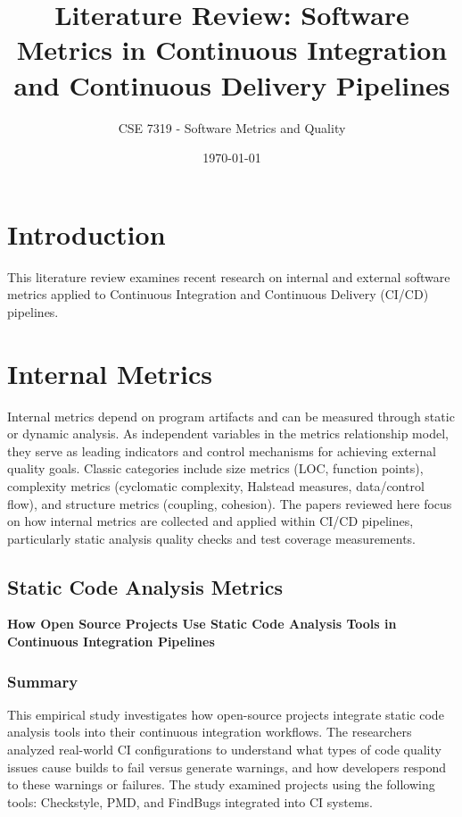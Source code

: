 \documentclass[12pt]{article}
\title{Literature Review: Software Metrics in Continuous Integration
and Continuous Delivery Pipelines}
\author{CSE 7319 - Software Metrics and Quality}
\date{\today}
\begin{document}
\maketitle

\section{Introduction}

This literature review examines recent research on internal and
external software metrics applied to Continuous Integration and Continuous Delivery (CI/CD)
pipelines.

\section{Internal Metrics}

Internal metrics depend on program artifacts and can be
measured through static or dynamic analysis. As independent variables
in the metrics relationship model, they serve as leading indicators
and control mechanisms for achieving external quality goals. Classic
categories include size metrics (LOC, function points), complexity
metrics (cyclomatic complexity, Halstead measures, data/control flow),
and structure metrics (coupling, cohesion). The papers reviewed here
focus on how internal metrics are collected and applied within CI/CD
pipelines, particularly static analysis quality checks and test
coverage measurements.

\subsection{Static Code Analysis Metrics}

\textbf{How Open Source Projects Use Static Code Analysis
	Tools in Continuous Integration Pipelines} \cite{zampetti2017static}

\subsubsection{Summary}
This empirical study investigates how open-source
projects integrate static code analysis tools into their continuous
integration workflows. The researchers analyzed real-world CI
configurations to understand what types of code quality issues cause
builds to fail versus generate warnings, and how developers respond
to these warnings or failures. The study examined projects using the following tools:
Checkstyle, PMD, and FindBugs integrated into CI systems.
\end{document}
